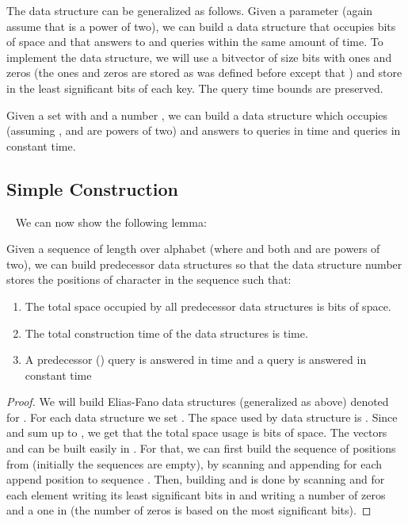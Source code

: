 \documentclass[11pt,runningheads]{llncs}
\begin{document}
{The data structure can be generalized as follows. 
Given a parameter  (again assume that  is a power of two), 
we can build a data structure that occupies  bits 
of space and that answers to  and  
queries within the same amount of time. To implement the data structure, 
we will use a bitvector  of size  bits with  ones 
and  zeros (the ones and zeros are stored as was defined before
except that ) and store in  the 
least significant  bits of each key. The query time bounds
are preserved. 
\begin{lemma}
Given a set  with  and a number , 
we can build a data structure which occupies
 (assuming , and  are powers of 
two) and answers to  queries in time  
and  queries in constant time. 
\end{lemma}

\subsection{Simple Construction}
~\label{sec:simple_Elias_Fano_build}
We can now show the following lemma: 
\begin{lemma}
\label{lemma:simple_Elias_Fano_build}
Given a sequence  of length  over alphabet  (where  and 
both  and  are powers of two), we can build  predecessor data structures 
so that the data structure number  stores the positions of character  in the sequence  such that: 
\begin{enumerate} 
\item The total space occupied by all predecessor data structures is  bits of space. 
\item The total construction time of the data structures is  time. 
\item A predecessor () query is answered in time  and 
a  query is answered in constant time
\end{enumerate}
\end{lemma}
\begin{proof}
We will build  Elias-Fano data structures (generalized as above)
denoted  for . 
For each data structure we set . The space used by data structure 
 is . 
Since  and  sum up to , we get that the total space usage is 
bits of space. The vectors  and  can be built easily in . 
For that, we can first build the sequence of positions  from  (initially the sequences 
are empty), by scanning  and appending for each  append position  to sequence . 
Then, building  and  is done by scanning  and for each element 
writing its least significant  bits in  and writing a number of zeros 
and a one in 
(the number of zeros is based on the  most significant bits). 


\end{proof}}
\end{document}

